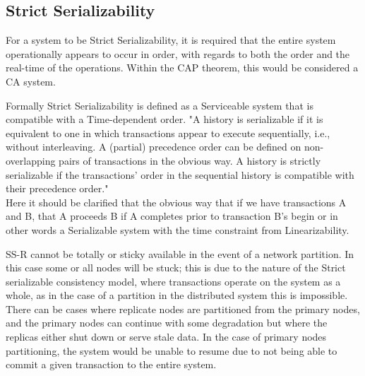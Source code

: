 \documentclass[a4paper,10pt,titlepage]{report}
\begin{document}
\subsection{Strict Serializability}

For a system to be Strict Serializability, it is required that the entire system operationally appears to occur in order, with regards to both the order and the real-time of the operations. Within the CAP theorem, this would be considered a CA system.\\
\vspace{5mm}

Formally Strict Serializability is defined as a Serviceable system that is compatible with a Time-dependent order.
"A history is serializable if it is equivalent to one in which transactions appear to execute sequentially, i.e., without interleaving. A (partial) precedence order can be defined on non-overlapping pairs of transactions in the obvious way. A history is strictly serializable if the transactions' order in the sequential history is compatible with their precedence order." \cite{10.1145/78969.78972}\\
\vspace{5mm}
Here it should be clarified that the obvious way that if we have transactions A and B, that A proceeds B if A completes prior to transaction B's begin or in other words a Serializable system with the time constraint from Linearizability.

SS-R cannot be totally or sticky available in the event of a network partition. In this case some or all nodes will be stuck; this is due to the nature of the Strict serializable consistency model, where transactions operate on the system as a whole, as in the case of a partition in the distributed system this is impossible. There can be cases where replicate nodes are partitioned from the primary nodes, and the primary nodes can continue with some degradation but where the replicas either shut down or serve stale data. In the case of primary nodes partitioning, the system would be unable to resume due to not being able to commit a given transaction to the entire system.
\end{document}

